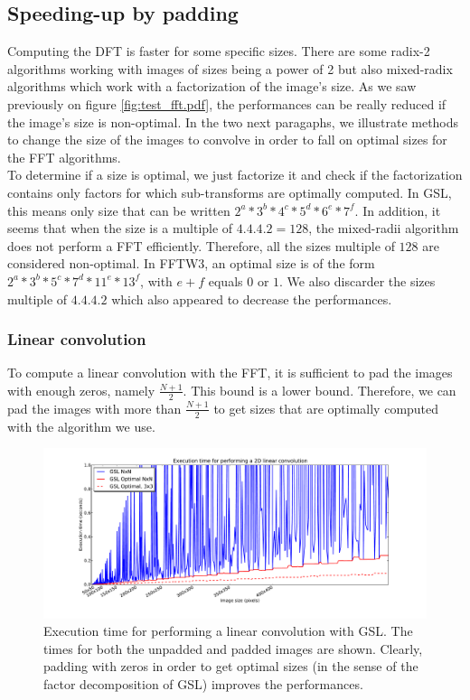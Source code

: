 \documentclass[a4paper,10pt,twoside]{article}
\begin{document}
\subsection{Speeding-up by padding}

Computing the DFT is faster for some specific sizes. There are some radix-2 algorithms working with images of sizes being a power of 2 but also mixed-radix algorithms which work with a factorization of the image's size. As we saw previously on figure \ref{fig:test_fft.pdf}, the performances can be really reduced if the image's size is non-optimal. In the two next paragaphs, we illustrate methods to change the size of the images to convolve in order to fall on optimal sizes for the FFT algorithms.\\

To determine if a size is optimal, we just factorize it and check if the factorization contains only factors for which sub-transforms are optimally computed. In GSL, this means only size that can be written $2^a*3^b*4^c*5^d*6^e*7^f$. In addition, it seems that when the size is a multiple of $4.4.4.2 = 128$, the mixed-radii algorithm does not perform a FFT efficiently. Therefore, all the sizes multiple of $128$ are considered non-optimal. In FFTW3, an optimal size is of the form $2^a*3^b*5^c*7^d*11^e*13^f$, with $e+f$ equals $0$ or $1$. We also discarder the sizes multiple of $4.4.4.2$ which also appeared to decrease the performances.\\

\subsubsection{Linear convolution}

To compute a linear convolution with the FFT, it is sufficient to pad the images with enough zeros, namely $\frac{N+1}{2}$. This bound is a lower bound. Therefore, we can pad the images with more than $\frac{N+1}{2}$ to get sizes that are optimally computed with the algorithm we use.\\

\begin{figure}[htbp]
\center \includegraphics[width=0.75\linewidth]{../Images/benchmark_linear_convolution_gsl.pdf}
\caption{\label{fig:benchmark_linear_convolution_gsl.pdf}Execution time for performing a linear convolution with GSL. The times for both the unpadded and padded images are shown. Clearly, padding with zeros in order to get optimal sizes (in the sense of the factor decomposition of GSL) improves the performances.}
\end{figure}
\end{document}

